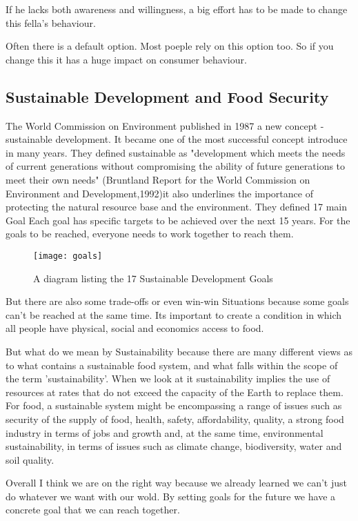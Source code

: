 If he lacks both awareness and willingness, a big effort has to be made to change this fella's
behaviour.

Often there is a default option. Most poeple rely on this option too. So if you change this it
has a huge impact on consumer behaviour.

\subsection{Sustainable Development
	and Food Security}
The World Commission on Environment published in 1987 a new concept - sustainable development. It became one of the most successful concept introduce in many years. They defined sustainable as "development which meets the needs of current generations without compromising the ability of future generations to meet their own needs" (Bruntland Report for the World Commission on Environment and Development,1992)it also underlines the importance of protecting the natural resource base and the environment. They defined 17 main Goal Each goal has specific targets to be achieved over the next 15 years. For the goals to be reached, everyone needs to work together to reach them.

\begin{figure}[H]	
	\centering
	\texttt{[image: goals]}
	\caption{A diagram listing the 17 Sustainable Development Goals}
	\label{fig:ha}
\end{figure}

But there are also some trade-offs or even win-win Situations because some goals can’t be reached at the same time.
Its important to create a condition in which all people have physical, social and economics access to food.

But what do we mean by Sustainability because there are many different views as to what contains a sustainable food system, and what falls within the scope of the term 'sustainability’. When we look at it sustainability implies the use of resources at rates that do not exceed the capacity of the Earth to replace them. For food, a sustainable system might be encompassing a range of issues such as security of the supply of food, health, safety, affordability, quality, a strong food industry in terms of jobs and growth and, at the same time, environmental sustainability, in terms of issues such as climate change, biodiversity, water and soil quality.

Overall I think we are on the right way because we already learned we can’t just do whatever we want with our wold. By setting goals for the future we have a concrete goal that we can reach together.
